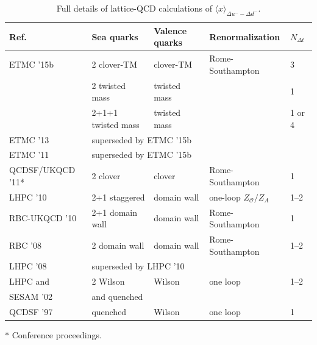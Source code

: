 \begin{table}[!t]
\renewcommand{\arraystretch}{1.2} 
\centering
\footnotesize
\begin{threeparttable}
\begin{tabular}{lllll}
\toprule
Ref. & Sea quarks & Valence quarks & Renormalization & $N_{\Delta t}$ \\
\midrule

  ETMC '15b \cite{Abdel-Rehim:2015owa} &
    2 clover-TM & clover-TM & Rome-Southampton & 3 \\
  & 2 twisted mass & twisted mass & & 1 \\
  & 2+1+1 twisted mass & twisted mass & & 1 or 4 \\

  ETMC '13 \cite{Alexandrou:2013joa} &
  \multicolumn{4}{l}{superseded by ETMC '15b} \\

  ETMC '11 \cite{Alexandrou:2011nr} &
  \multicolumn{4}{l}{superseded by ETMC '15b} \\

  QCDSF/UKQCD '11* \cite{Pleiter:2011gw} &
  2 clover & clover & Rome-Southampton & 1 \\

  LHPC '10 \cite{Bratt:2010jn} &
  2+1 staggered & domain wall & one-loop $Z_\mathcal{O}/Z_A$ & 1--2 \\

  RBC-UKQCD '10 \cite{Aoki:2010xg} &
  2+1 domain wall & domain wall & Rome-Southampton & 1 \\

  RBC '08 \cite{Lin:2008uz} &
  2 domain wall & domain wall & Rome-Southampton & 1--2 \\

  LHPC '08 \cite{Hagler:2007xi} &
  \multicolumn{4}{l}{superseded by LHPC '10} \\

  LHPC and &
  2 Wilson & Wilson & one loop & 1--2 \\
  SESAM '02 \cite{Dolgov:2002zm} &
  and quenched & & & \\

  QCDSF '97 \cite{Gockeler:1997zr} &
  quenched & Wilson & one loop & 1 \\
\bottomrule
\end{tabular}
\begin{tablenotes}
\scriptsize
\item[$*$] Conference proceedings.
\end{tablenotes}
\end{threeparttable}
\caption{\small Full details of lattice-QCD calculations of 
$\langle x\rangle_{\Delta u^--\Delta d^-}$.}
\label{tab:nonisopolcase}
\end{table}

